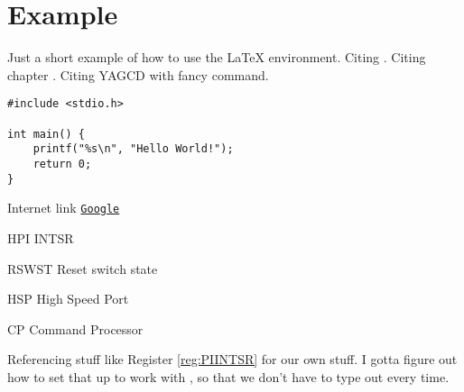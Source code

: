 \chapter{Example}

Just a short example of how to use the \LaTeX{} environment. Citing \cite{DolphinDSP}. Citing chapter \YAGCD[5]{}.
Citing YAGCD \YAGCD{} with fancy command.

\begin{codebox}
    \begin{verbatim}     
#include <stdio.h>

int main() {
    printf("%s\n", "Hello World!");
    return 0;
}
    \end{verbatim}
\end{codebox}

\noindent Internet link \href{http://www.google.com}{\texttt{Google}}

\begin{register}{H}{PI INTSR}{}
    \label{reg:PIINTSR}
    \regnewline
    \begin{regdesc}\begin{reglist}
        \item [RSWST] Reset switch state
        \item [HSP] High Speed Port
        \item [CP] Command Processor
    \end{reglist}\end{regdesc}
\end{register}
Referencing stuff like Register \ref{reg:PIINTSR} for our own stuff. I gotta figure out how to set that up to work with \texttt{\Cref}, so that we don't have to type out  every time.